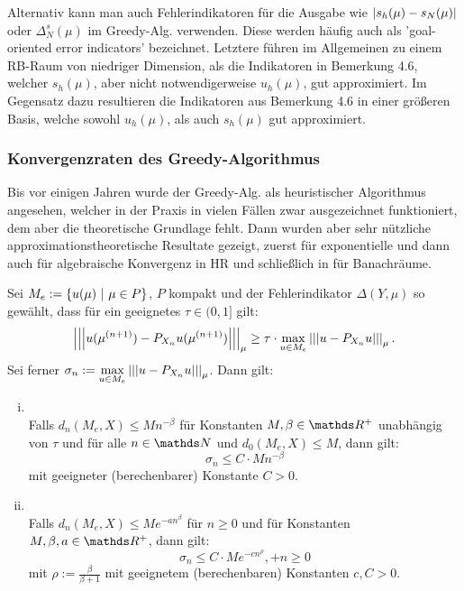 Alternativ kann man auch Fehlerindikatoren für die Ausgabe wie $\left\vert s_h(\mu)-s_N(\mu)\right\vert$ oder $\Delta_N^s(\mu)$ im Greedy-Alg. verwenden.
Diese werden häufig auch als 'goal-oriented error indicators' bezeichnet.
Letztere führen im Allgemeinen zu einem RB-Raum von niedriger Dimension, als die Indikatoren in Bemerkung 4.6, welcher $s_h(\mu)$, aber nicht notwendigerweise $u_h(\mu)$, gut approximiert.
Im Gegensatz dazu resultieren die Indikatoren aus Bemerkung 4.6 in einer größeren Basis, welche sowohl $u_h(\mu)$, als auch $s_h(\mu)$ gut approximiert.

\subsubsection{Konvergenzraten des Greedy-Algorithmus}
Bis vor einigen Jahren wurde der Greedy-Alg. als heuristischer Algorithmus angesehen, welcher in der Praxis in vielen Fällen zwar ausgezeichnet funktioniert, dem aber die theoretische Grundlage fehlt.
Dann wurden aber sehr nützliche approximationstheoretische Resultate gezeigt, zuerst f\"{u}r exponentielle \cite{Bufetal2012} und dann auch für algebraische Konvergenz \cite{Binetal2011} in HR und schließlich in \cite{DePeWo13} für Banachräume.

Sei $M_e := \left\{u(\mu)~|~\mu\in P\right\}$, $P$ kompakt und der Fehlerindikator $\Delta(Y,\mu)$ so gewählt, dass für ein geeignetes $\tau\in (0,1]$ gilt:
\begin{align}
\left|\left|\left|u(\mu^{(n+1)})-P_{X_n} u(\mu^{(n+1)})\right|\right|\right|_\mu \ge \tau \cdot \max\limits_{u\in M_e} \left|\left|\left|u-P_{X_n}u\right|\right|\right|_\mu.
\end{align} 
Sei ferner $\sigma_n := \max\limits_{u\in M_e} \left|\left|\left|u-P_{X_n}u\right|\right|\right|_\mu$.
Dann gilt:
\begin{enumerate}[(i)]
	\item {}\\
	Falls $d_n(M_e,X)\le M n^{-\beta}$ für Konstanten $M,\beta\in \R^+$ unabhängig von $\tau$ und für alle $n\in \N$ und $d_0(M_e,X)\le M$, dann gilt:
	\[
	\sigma_n \le C\cdot Mn^{-\beta}
	\]
	mit geeigneter (berechenbarer) Konstante $C>0$.
	\item {}\\
	Falls $d_n(M_e,X) \le M e^{-an^\beta}$ für $n\ge 0$ und für Konstanten $M,\beta, a\in \R^+$, dann gilt:
	\[
	\sigma_n\le C\cdot Me^{-cn^\rho}, +n\ge 0
	\]
	mit $\rho := \frac{\beta}{\beta+1}$ mit geeignetem (berechenbaren) Konstanten $c,C>0$.
\end{enumerate}

